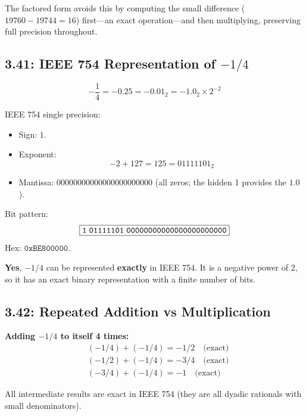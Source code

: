 The factored form avoids this by computing the small difference ($19760 -
19744 = 16$) first---an exact operation---and then multiplying, preserving full
precision throughout.

\subsection*{3.41: IEEE 754 Representation of $-1/4$}
\hypertarget{sol-3.41}{}

\[
  -\frac{1}{4} = -0.25 = -0.01_2 = -1.0_2 \times 2^{-2}
\]

IEEE 754 single precision:
\begin{itemize}
  \item Sign: $1$.
  \item Exponent:
    \[
      -2 + 127 = 125 = 01111101_2
    \]
  \item Mantissa: $00000000000000000000000$ (all zeros; the hidden 1 provides
        the $1.0$).
\end{itemize}

Bit pattern:
\[
  \boxed{\texttt{1\;01111101\;00000000000000000000000}}
\]
Hex: $\texttt{0xBE800000}$.

\textbf{Yes}, $-1/4$ can be represented \textbf{exactly} in IEEE 754. It is
a negative power of 2, so it has an exact binary representation with a finite
number of bits.

\subsection*{3.42: Repeated Addition vs Multiplication}
\hypertarget{sol-3.42}{}

\noindent\textbf{Adding $-1/4$ to itself 4 times:}
\begin{align*}
  &(-1/4) + (-1/4) = -1/2 \quad\text{(exact)} \\
  &(-1/2) + (-1/4) = -3/4 \quad\text{(exact)} \\
  &(-3/4) + (-1/4) = -1   \quad\text{(exact)}
\end{align*}

All intermediate results are exact in IEEE 754 (they are all dyadic rationals
with small denominators).

